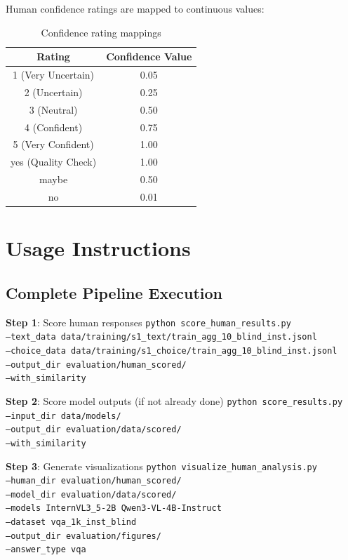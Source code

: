 \documentclass{article}
\begin{document}
Human confidence ratings are mapped to continuous values:

\begin{table}[h]
\centering
\begin{tabular}{|c|c|}
\hline
\textbf{Rating} & \textbf{Confidence Value} \\
\hline
1 (Very Uncertain) & 0.05 \\
2 (Uncertain) & 0.25 \\
3 (Neutral) & 0.50 \\
4 (Confident) & 0.75 \\
5 (Very Confident) & 1.00 \\
\hline
yes (Quality Check) & 1.00 \\
maybe & 0.50 \\
no & 0.01 \\
\hline
\end{tabular}
\caption{Confidence rating mappings}
\end{table}

\section{Usage Instructions}

\subsection{Complete Pipeline Execution}

\begin{algorithm}
\caption{Human-Model Alignment Analysis}
\begin{algorithmic}[1]
\STATE \textbf{Step 1}: Score human responses
\STATE \texttt{python score\_human\_results.py \\
    --text\_data data/training/s1\_text/train\_agg\_10\_blind\_inst.jsonl \\
    --choice\_data data/training/s1\_choice/train\_agg\_10\_blind\_inst.jsonl \\
    --output\_dir evaluation/human\_scored/ \\
    --with\_similarity}

\STATE \textbf{Step 2}: Score model outputs (if not already done)
\STATE \texttt{python score\_results.py \\
    --input\_dir data/models/ \\
    --output\_dir evaluation/data/scored/ \\
    --with\_similarity}

\STATE \textbf{Step 3}: Generate visualizations
\STATE \texttt{python visualize\_human\_analysis.py \\
    --human\_dir evaluation/human\_scored/ \\
    --model\_dir evaluation/data/scored/ \\
    --models InternVL3\_5-2B Qwen3-VL-4B-Instruct \\
    --dataset vqa\_1k\_inst\_blind \\
    --output\_dir evaluation/figures/ \\
    --answer\_type vqa}
\end{algorithmic}
\end{algorithm}
\end{document}
